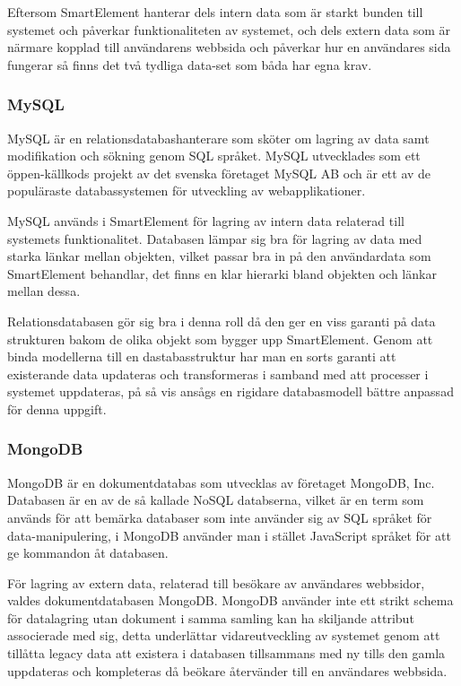 Eftersom SmartElement hanterar dels intern data som är starkt bunden till systemet och påverkar funktionaliteten av systemet, och dels extern data som är närmare kopplad till användarens webbsida och påverkar hur en användares sida fungerar så finns det två tydliga data-set som båda har egna krav.

\subsubsection{MySQL}

MySQL är en relationsdatabashanterare som sköter om lagring av data samt modifikation och sökning genom SQL språket. MySQL utvecklades som ett öppen-källkods projekt av det svenska företaget MySQL AB och är ett av de populäraste databassystemen för utveckling av webapplikationer. \citep{dbengines}

MySQL används i SmartElement för lagring av intern data relaterad till systemets funktionalitet. Databasen lämpar sig bra för lagring av data med starka länkar mellan objekten, vilket passar bra in på den användardata som SmartElement behandlar, det finns en klar hierarki bland objekten och länkar mellan dessa.

Relationsdatabasen gör sig bra i denna roll då den ger en viss garanti på data strukturen bakom de olika objekt som bygger upp SmartElement. Genom att binda modellerna till en dastabasstruktur har man en sorts garanti att existerande data updateras och transformeras i samband med att processer i systemet uppdateras, på så vis ansågs en rigidare databasmodell bättre anpassad för denna uppgift.

\subsubsection{MongoDB}

MongoDB är en dokumentdatabas som utvecklas av företaget MongoDB, Inc. Databasen är en av de så kallade NoSQL databserna, vilket är en term som används för att bemärka databaser som inte använder sig av SQL språket för data-manipulering, i MongoDB använder man i stället JavaScript språket för att ge kommandon åt databasen.

För lagring av extern data, relaterad till besökare av användares webbsidor, valdes dokumentdatabasen MongoDB. MongoDB använder inte ett strikt schema för datalagring utan dokument i samma samling kan ha skiljande attribut associerade med sig, detta underlättar vidareutveckling av systemet genom att tillåtta legacy data att existera i databasen tillsammans med ny tills den gamla uppdateras och kompleteras då beökare återvänder till en användares webbsida.

